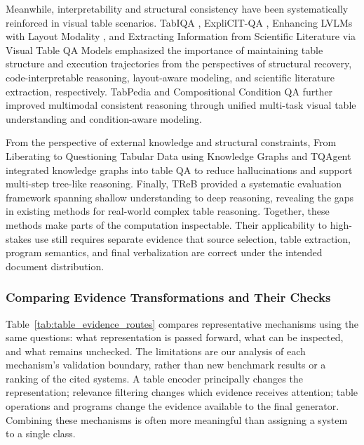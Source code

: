 Meanwhile, interpretability and structural consistency have been systematically reinforced in visual table scenarios. TabIQA \cite{nguyen2023tabiqa}, ExpliCIT-QA \cite{hormazabal2025explicit}, Enhancing LVLMs with Layout Modality \cite{aida2025enhancing}, and Extracting Information from Scientific Literature via Visual Table QA Models \cite{kim2024extracting} emphasized the importance of maintaining table structure and execution trajectories from the perspectives of structural recovery, code-interpretable reasoning, layout-aware modeling, and scientific literature extraction, respectively. TabPedia \cite{zhao2024tabpedia} and Compositional Condition QA \cite{jiangcompositional} further improved multimodal consistent reasoning through unified multi-task visual table understanding and condition-aware modeling.

From the perspective of external knowledge and structural constraints, From Liberating to Questioning Tabular Data using Knowledge Graphs \cite{raj2024liberating} and TQAgent \cite{zhao2025tqagent} integrated knowledge graphs into table QA to reduce hallucinations and support multi-step tree-like reasoning. Finally, TReB \cite{li2025treb} provided a systematic evaluation framework spanning shallow understanding to deep reasoning, revealing the gaps in existing methods for real-world complex table reasoning. Together, these methods make parts of the computation inspectable. Their applicability to high-stakes use still requires separate evidence that source selection, table extraction, program semantics, and final verbalization are correct under the intended document distribution.

\subsubsection{Comparing Evidence Transformations and Their Checks}

Table~\ref{tab:table_evidence_routes} compares representative mechanisms using the same questions: what representation is passed forward, what can be inspected, and what remains unchecked. The limitations are our analysis of each mechanism's validation boundary, rather than new benchmark results or a ranking of the cited systems. A table encoder principally changes the representation; relevance filtering changes which evidence receives attention; table operations and programs change the evidence available to the final generator. Combining these mechanisms is often more meaningful than assigning a system to a single class.

